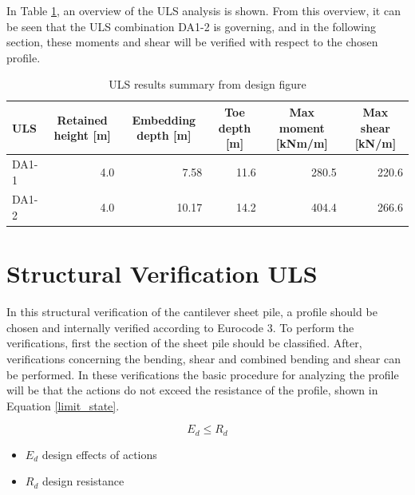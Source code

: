 In Table \ref{tab:uls_summary}, an overview of the ULS analysis is shown. From this overview, it can be seen that the ULS combination DA1-2 is governing, and in the following section, these moments and shear will be verified with respect to the chosen profile.

\begin{table}[H]
  \centering
  \caption{ULS results summary from design figure}
  \label{tab:uls_summary}
  \small
  \setlength{\tabcolsep}{8pt}
  \renewcommand{\arraystretch}{1.15}
  \begin{tabular}{@{}l r r r r r@{}}
    \toprule
    ULS & \multicolumn{1}{c}{Retained height [m]} & \multicolumn{1}{c}{Embedding depth [m]} & \multicolumn{1}{c}{Toe depth [m]} & \multicolumn{1}{c}{Max moment [kNm/m]} & \multicolumn{1}{c}{Max shear [kN/m]} \\
    \midrule
    DA1-1   & 4.0 & 7.58 & 11.6 & 280.5 & 220.6 \\
    DA1-2  & 4.0 & 10.17 & 14.2 & 404.4 & 266.6 \\
    \bottomrule
  \end{tabular}
\end{table}


\section{Structural Verification ULS}

In this structural verification of the cantilever sheet pile, a profile should be chosen and internally verified according to Eurocode 3. To perform the verifications, first the section of the sheet pile should be classified. After, verifications concerning the bending, shear and combined bending and shear can be performed. In these verifications the basic procedure for analyzing the profile will be that the actions do not exceed the resistance of the profile, shown in Equation \ref{limit_state}.


\begin{equation}
    E_{d} \leq R_{d}
    \label{limit_state}
\end{equation}

\begin{itemize}
    \item $E_{d}$    design effects of actions
    \item $R_{d}$   design resistance
\end{itemize}

